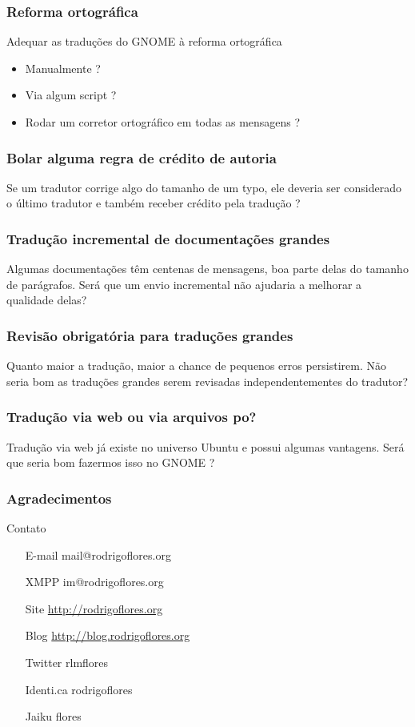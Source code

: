 \documentclass{beamer}
\begin{document}
\begin{frame}
    \frametitle{Reforma ortográfica}

    Adequar as traduções do GNOME à reforma ortográfica
    \begin{itemize}[<+->]
        \item Manualmente ? 
        \item Via algum script ?
        \item Rodar um corretor ortográfico em todas as mensagens ?  
    \end{itemize}
\end{frame}

\begin{frame}
    \frametitle{Bolar alguma regra de crédito de autoria}
    Se um tradutor corrige algo do tamanho de um typo, ele deveria ser considerado o último tradutor e também receber crédito pela tradução ? 
\end{frame}

\begin{frame}
    \frametitle{Tradução incremental de documentações grandes}
    Algumas documentações têm centenas de mensagens, boa parte delas do tamanho de parágrafos. 
    Será que um envio incremental não ajudaria a melhorar a qualidade delas?
\end{frame}

\begin{frame}
    \frametitle{Revisão obrigatória para traduções grandes}
    Quanto maior a tradução, maior a chance de pequenos erros persistirem. 
    Não seria bom as traduções grandes serem revisadas independentementes do tradutor?
\end{frame}

\begin{frame}
    \frametitle{Tradução via web ou via arquivos po?}
    Tradução via web já existe no universo Ubuntu e possui algumas vantagens. Será que seria bom
    fazermos isso no GNOME ?
\end{frame}


\begin{frame}
  \frametitle{Agradecimentos}
\end{frame}

\begin{frame}
    \begin{block}{Contato}     
    \begin{itemize}
            \centering
            \item[E-mail] mail@rodrigoflores.org 
            \item[XMPP]  im@rodrigoflores.org        
            \item[Site]  \url{http://rodrigoflores.org}
            \item[Blog]  \url{http://blog.rodrigoflores.org}        
            \item[Twitter] rlmflores 
            \item[Identi.ca] rodrigoflores        
            \item[Jaiku] flores        
        \end{itemize}
    \end{block}
\end{frame}
\end{document}

